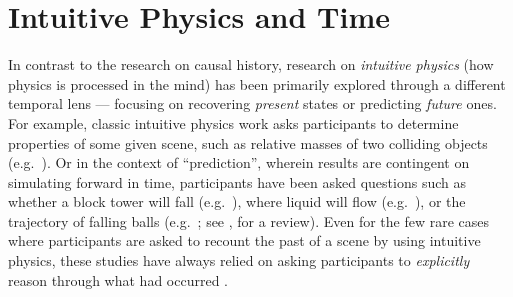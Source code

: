 \section{Intuitive Physics and Time}
In contrast to the research on causal history, research on \textit{intuitive physics} (how physics is processed in the mind) has been primarily explored through a different temporal lens --- focusing on recovering \textit{present} states or predicting \textit{future} ones.  For example, classic intuitive physics work asks participants to determine properties of some given scene, such as relative masses of two colliding objects (e.g.~\cite{todd_visual_1982, gilden_understanding_1989}).  Or in the context of “prediction”, wherein results are contingent on simulating forward in time, participants have been asked questions such as whether a block tower will fall (e.g.~\cite{hamrick_inferring_2016,battaglia_simulation_2013}), where liquid will flow (e.g.~\cite{bates_humans_2015}), or the trajectory of falling balls (e.g.~\cite{mccloskey_etal_1983}; see \cite{kubricht_intuitive_2017}, for a review).  Even for the few rare cases where participants are asked to recount the past of a scene by using intuitive physics, these studies have always relied on asking participants to \textit{explicitly} reason through what had occurred \parencite{beller_looking_2022}.

